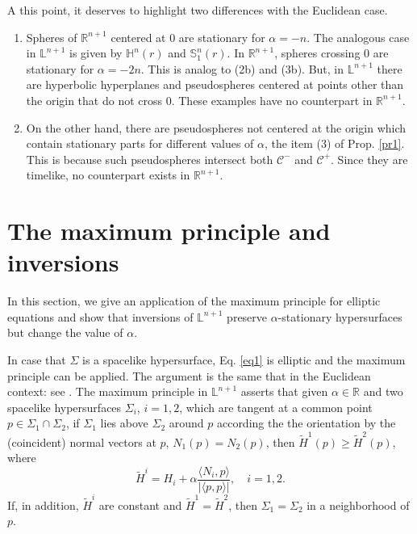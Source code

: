 \documentclass[a4paper,12pt]{amsart}
\theoremstyle{definition}
\def\r{\mathbb R}
\def\h{\mathbb H}
\def\l{\mathbb L}
\def\s{\mathbb S}
\begin{document}
A this point, it deserves to highlight two differences with the Euclidean case.  
 \begin{enumerate}
 \item Spheres of $\r^{n+1}$ centered at $0$ are stationary for $\alpha=-n$. The  analogous case in $\l^{n+1}$ is given by $\h^n(r)$ and $\s_1^n(r)$. In $\r^{n+1}$, spheres crossing $0$ are stationary for $\alpha=-2n$. This is analog to (2b) and (3b). But, in $\l^{n+1}$ there are hyperbolic hyperplanes and pseudospheres centered at points other than the origin that do not cross $0$. These examples have no counterpart in $\r^{n+1}$. 
 \item On the other hand, there are pseudospheres not centered at the origin which contain stationary parts for different values of $\alpha$, the item (3) of Prop. \ref{pr1}. This is because such pseudospheres intersect both $\mathcal{C}^-$ and $\mathcal{C}^+$.   Since they are timelike, no counterpart exists in $\r^{n+1}$.
\end{enumerate}
 
 \section{The maximum principle and inversions}\label{s22}
 
 In  this section, we give an application of the maximum principle for elliptic equations and show that inversions of $\l^{n+1}$ preserve $\alpha$-stationary hypersurfaces but change the value of $\alpha$. 
 
In case that $\Sigma$ is a spacelike hypersurface, Eq. \eqref{eq1} is elliptic and the maximum principle can be applied. The argument is the same that in the Euclidean context: see \cite[Prop. 2.5]{dl1}. The maximum principle in $\l^{n+1}$ asserts that given $\alpha\in\r$ and two spacelike hypersurfaces $\Sigma_i$, $i=1,2$, which are tangent at a common point $p\in\Sigma_1\cap\Sigma_2$, if $\Sigma_1$ lies above $\Sigma_2$ around $p$ according the the orientation by the (coincident) normal vectors at $p$, $N_1(p)=N_2(p)$, then $\widetilde{H}^1(p)\geq \widetilde{H}^2(p)$, where 
$$\widetilde{H}^i=H_i+\alpha\frac{\langle N_i,p\rangle}{|\langle p,p\rangle|},\quad i=1,2.$$
  If, in addition,  $\widetilde{H}^i$ are constant and $\widetilde{H}^1=\widetilde{H}^2$, then $\Sigma_1=\Sigma_2$ in a neighborhood of $p$. 
  
\end{document}
